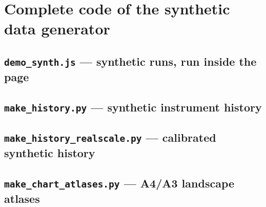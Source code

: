 \chapter{Complete code of the synthetic data generator}\label{app:generator}
\section{\texttt{demo\_synth.js} — synthetic runs, run inside the page}

\section{\texttt{make\_history.py} — synthetic instrument history}

\section{\texttt{make\_history\_realscale.py} — calibrated synthetic history}

\section{\texttt{make\_chart\_atlases.py} — A4/A3 landscape atlases}



